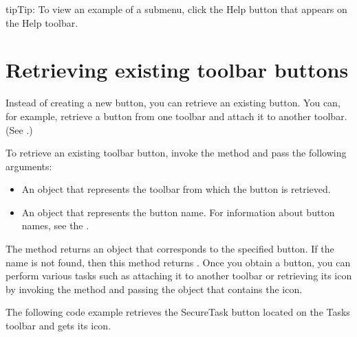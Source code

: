 \documentclass[letterpaper,12pt,english,openany,oneside]{sphinxmanual}
\begin{document}
\begin{sphinxadmonition}{tip}{Tip:}
To view an example of a sub\sphinxhyphen{}menu, click the Help button that appears on the Help toolbar.
\end{sphinxadmonition}


\section{Retrieving existing toolbar buttons}
\label{\detokenize{Plugins_Toolbutton:retrieving-existing-toolbar-buttons}}
Instead of creating a new button, you can retrieve an existing button. You can, for example, retrieve a button from one toolbar and attach it to another toolbar. (See .)

To retrieve an existing toolbar button, invoke the  method and pass the following arguments:
\begin{itemize}
\item {} 
An  object that represents the toolbar from which the button is retrieved.

\item {} 
An  object that represents the button name. For information about button names, see the .

\end{itemize}

The  method returns an  object that corresponds to the specified button. If the name is not found, then this method returns . Once you obtain a button, you can perform various tasks such as attaching it to another toolbar or retrieving its icon by invoking the  method and passing the  object that contains the icon.

The following code example retrieves the SecureTask button located on the Tasks toolbar and gets its icon.
\end{document}
